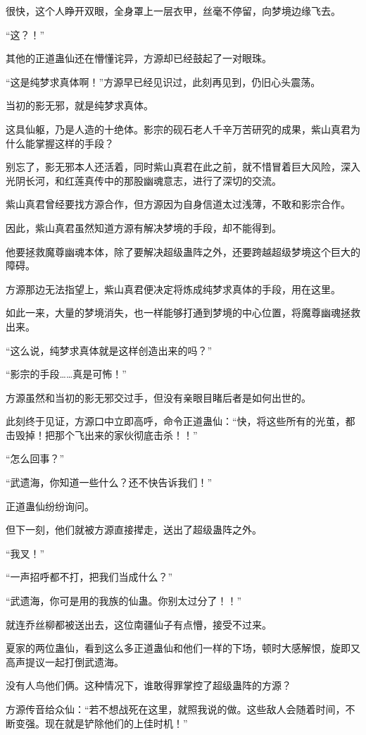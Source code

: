 \begin{this_body}
很快，这个人睁开双眼，全身罩上一层衣甲，丝毫不停留，向梦境边缘飞去。

“这？！”

其他的正道蛊仙还在懵懂诧异，方源却已经鼓起了一对眼珠。

“这是纯梦求真体啊！”方源早已经见识过，此刻再见到，仍旧心头震荡。

当初的影无邪，就是纯梦求真体。

这具仙躯，乃是人造的十绝体。影宗的砚石老人千辛万苦研究的成果，紫山真君为什么能掌握这样的手段？

别忘了，影无邪本人还活着，同时紫山真君在此之前，就不惜冒着巨大风险，深入光阴长河，和红莲真传中的那股幽魂意志，进行了深切的交流。

紫山真君曾经要找方源合作，但方源因为自身信道太过浅薄，不敢和影宗合作。

因此，紫山真君虽然知道方源有解决梦境的手段，却不能得到。

他要拯救魔尊幽魂本体，除了要解决超级蛊阵之外，还要跨越超级梦境这个巨大的障碍。

方源那边无法指望上，紫山真君便决定将炼成纯梦求真体的手段，用在这里。

如此一来，大量的梦境消失，也一样能够打通到梦境的中心位置，将魔尊幽魂拯救出来。

“这么说，纯梦求真体就是这样创造出来的吗？”

“影宗的手段……真是可怖！”

方源虽然和当初的影无邪交过手，但没有亲眼目睹后者是如何出世的。

此刻终于见证，方源口中立即高呼，命令正道蛊仙：“快，将这些所有的光茧，都击毁掉！把那个飞出来的家伙彻底击杀！！”

“怎么回事？”

“武遗海，你知道一些什么？还不快告诉我们！”

正道蛊仙纷纷询问。

但下一刻，他们就被方源直接撵走，送出了超级蛊阵之外。

“我叉！”

“一声招呼都不打，把我们当成什么？”

“武遗海，你可是用的我族的仙蛊。你别太过分了！！”

就连乔丝柳都被送出去，这位南疆仙子有点懵，接受不过来。

夏家的两位蛊仙，看到这么多正道蛊仙和他们一样的下场，顿时大感解恨，旋即又高声提议一起打倒武遗海。

没有人鸟他们俩。这种情况下，谁敢得罪掌控了超级蛊阵的方源？

方源传音给众仙：“若不想战死在这里，就照我说的做。这些敌人会随着时间，不断变强。现在就是铲除他们的上佳时机！”


\end{this_body}
